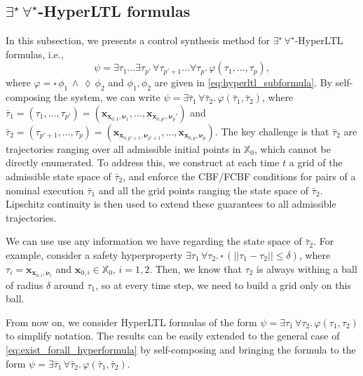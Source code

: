 \documentclass[letterpaper, 10 pt, conference]{ieeeconf}  %
\begin{document}
\subsection{$\exists^\star \, \forall^\star$-HyperLTL formulas}

In this subsection, we presents a control synthesis method for $\exists^\star \, \forall^\star$-HyperLTL formulas, i.e.,
\begin{equation} \label{eq:exist_forall_hyperformula}
    \psi = \exists \tau_1 \dots \exists \tau_{p'} \, \forall \tau_{p' + 1} \dots \forall \tau_p . \, \varphi(\tau_1, \dots, \tau_p), 
\end{equation}
where $\varphi = \square \, \phi_1 \, \land \, \lozenge \, \phi_2$ and $\phi_1, \phi_2$ are given in \eqref{eq:hyperltl_subformula}. By self-composing the system, we can write $ \psi = \exists \bar{\tau}_1 \, \forall \bar{\tau}_2 . \, \varphi(\bar{\tau}_1, \bar{\tau}_2)$, where $\bar{\tau}_1 = (\tau_1, \dots, \tau_{p'}) = (\mathbf{x}_{\mathbf{x}_{0, 1}, \boldsymbol{\nu}_1}, \dots, \mathbf{x}_{\mathbf{x}_{0, p'}, \boldsymbol{\nu}_p'})$ and $\bar{\tau}_2 = (\tau_{p' + 1}, \dots, \tau_p) = (\mathbf{x}_{\mathbf{x}_{0, p'+1}, \boldsymbol{\nu}_{p'+1}}, \dots, \mathbf{x}_{\mathbf{x}_{0, p}, \boldsymbol{\nu}_p})$. The key challenge is that $\bar{\tau}_2$ are trajectories ranging over all admissible initial points in $\mathbb{X}_0$, which cannot be directly enumerated. To address this, we construct at each time $t$ a grid of the admissible state space of $\bar{\tau}_2$, and enforce the CBF/FCBF conditions for pairs of a nominal execution $\bar{\tau}_1$ and all the grid points ranging the state space of $\bar{\tau}_2$. Lipschitz continuity is then used to extend these guarantees to all admissible trajectories.

We can use use any information we have regarding the state space of $\bar{\tau}_2$. For example, consider a safety hyperproperty $\exists \tau_1 \, \forall \tau_2. \, \square \, (||\tau_1 - \tau_2|| \leq \delta)$, where $\tau_i = \mathbf{x}_{\mathbf{x}_{0,i}, \boldsymbol{\nu}_i}$ and $\mathbf{x}_{0,i} \in \mathbb{X}_0$, $i = 1,2$. Then, we know that $\tau_2$ is always withing a ball of radius $\delta$ around $\tau_1$, so at every time step, we need to build a grid only on this ball.

From now on, we consider HyperLTL formulas of the form $\psi = \exists \tau_1 \, \forall \tau_2 . \, \varphi(\tau_1, \tau_2)$ to simplify notation. The results can be easily extended to the general case of \eqref{eq:exist_forall_hyperformula} by self-composing and bringing the formula to the form $\psi = \exists \bar{\tau}_1 \, \forall \bar{\tau}_2 . \, \varphi(\bar{\tau}_1, \bar{\tau}_2)$.
\end{document}
